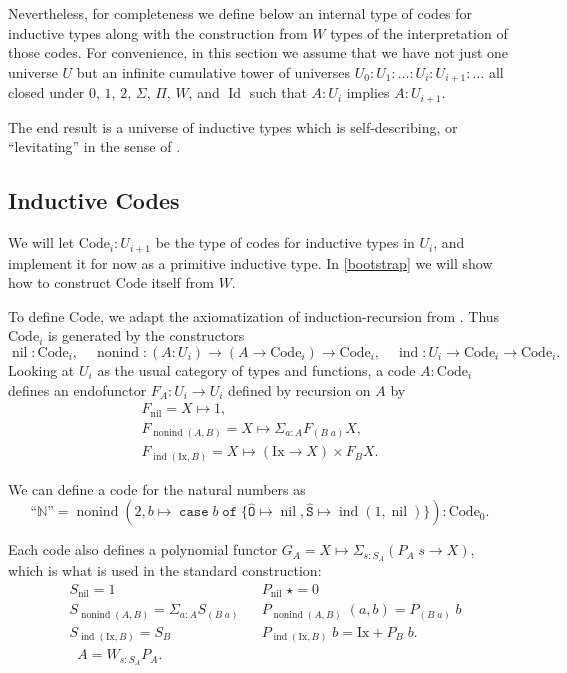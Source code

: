 \documentclass[a4paper,UKenglish,cleveref,nameinlink,autoref,thm-restate]{lipics-v2019}
\newcommand{\zero}{0}
\newcommand{\one}{1}
\newcommand{\bool}{2}
\newcommand{\codeO}{\mathtt{\hat{O}}}
\newcommand{\codeS}{\mathtt{\hat{S}}}
\newcommand{\N}{\hyperref[define-N]{\mathbb{N}}}
\DeclareMathOperator{\case}{\mathtt{case}}
\newcommand{\caset}[2]{\case {#1}\;\mathtt{of}\;\{{#2}\}}
\DeclareMathOperator{\Idop}{\mathrm{Id}}
\DeclareMathOperator{\nonind}{nonind}
\DeclareMathOperator{\ind}{ind}
\DeclareMathOperator{\nil}{nil}
\newcommand{\Code}{\mathrm{Code}}
\newcommand{\Ix}{\mathrm{Ix}}
\DeclareMathOperator{\preEl}{\tilde{El}}
\newcommand{\mathquote}[1]{\text{``${#1}$''}}
\begin{document}
Nevertheless, for completeness we define below an internal type of codes for inductive types along with the construction from $W$ types of the interpretation of those codes. For convenience, in this section we assume that we have not just one universe $U$ but an infinite cumulative tower of universes $U_0 : U_1 : \dots : U_i : U_{i+1} : \dots$ all closed under $\zero$, $\one$, $\bool$, $\Sigma$, $\Pi$, $W$, and $\Idop$ such that $A : U_i$ implies $A : U_{i+1}$.

The end result is a universe of inductive types which is self-describing, or ``levitating'' in the sense of \cite{levitation}.

\subsection{Inductive Codes}\label{inductive-codes}
We will let $\Code_i : U_{i+1}$ be the type of codes for inductive types in $U_i$, and implement it for now as a primitive inductive type. In \cref{bootstrap} we will show how to construct $\Code$ itself from $W$.

To define $\Code$, we adapt the axiomatization of induction-recursion from \cite{finite-axiom-IR}. Thus $\Code_i$ is generated by the constructors
\[\nil : \Code_i,\quad \nonind : (A : U_i) \to (A \to \Code_i) \to \Code_i, \quad \ind : U_i \to \Code_i \to \Code_i.\]
Looking at $U_i$ as the usual category of types and functions, a code $A : \Code_i$ defines an endofunctor $F_A : U_i \to U_i$ defined by recursion on $A$ by
\begin{gather}
F_{\nil} = X \mapsto \one,\\
F_{\nonind(A,B)} = X \mapsto \Sigma_{a : A} F_{(B\;a)} X,\\
F_{\ind(\Ix, B)} = X \mapsto (\Ix \to X) \times F_{B} X.
\end{gather}

\begin{example}We can define a code for the natural numbers as \[\mathquote{\N} = \nonind(2, b \mapsto \caset{b}{\codeO \mapsto \nil, \codeS\mapsto \ind(1, \nil)}) : \Code_0.\]
\end{example}

Each code also defines a polynomial functor $G_A = X \mapsto \Sigma_{s : S_A} (P_A\;s \to X)$, which is what is used in the standard construction:
\begin{align}
&S_{\nil} = 1 & &P_{\nil}\;\star = 0\\
&S_{\nonind(A,B)} = \Sigma_{a : A} S_{(B\;a)} & &P_{\nonind(A, B)}\;(a,b) = P_{(B\;a)}\;b \\
&S_{\ind(\Ix, B)} = S_B & &P_{\ind(\Ix, B)}\;b = \Ix + P_B\;b.\\
&\preEl A = W_{s : S_A}P_A.
\end{align}
\end{document}
